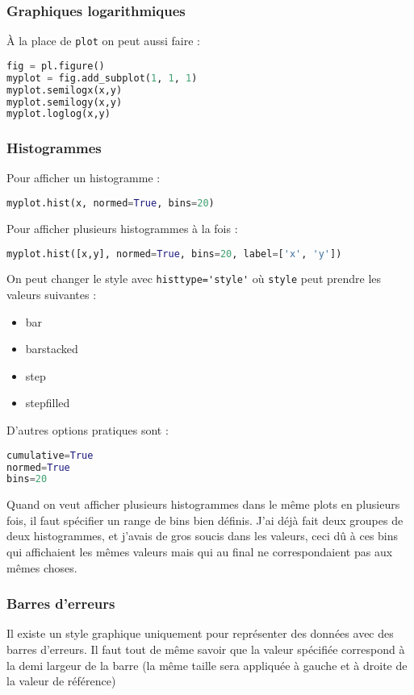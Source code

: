 \documentclass[a4paper,twoside]{article}
\begin{document}
\subsubsection{Graphiques logarithmiques}

À la place de \verb|plot| on peut aussi faire :
\begin{lstlisting}[language=python]
fig = pl.figure()
myplot = fig.add_subplot(1, 1, 1)
myplot.semilogx(x,y)
myplot.semilogy(x,y)
myplot.loglog(x,y)
\end{lstlisting}

\subsubsection{Histogrammes}
Pour afficher un histogramme :
\begin{lstlisting}[language=python]
myplot.hist(x, normed=True, bins=20)
\end{lstlisting}

Pour afficher plusieurs histogrammes à la fois :
\begin{lstlisting}[language=python]
myplot.hist([x,y], normed=True, bins=20, label=['x', 'y'])
\end{lstlisting}

\bigskip

On peut changer le style avec \verb|histtype='style'| où \verb|style| peut prendre les valeurs suivantes :
\begin{itemize}
\item bar
\item barstacked
\item step
\item stepfilled
\end{itemize}

D'autres options pratiques sont :
\begin{lstlisting}[language=python]
cumulative=True
normed=True
bins=20
\end{lstlisting}

\begin{attention}
Quand on veut afficher plusieurs histogrammes dans le même plots en plusieurs fois, il faut spécifier un range de bins bien définis. J'ai déjà fait deux groupes de deux histogrammes, et j'avais de gros soucis dans les valeurs, ceci dû à ces bins qui affichaient les mêmes valeurs mais qui au final ne correspondaient pas aux mêmes choses.
\end{attention}

\subsubsection{Barres d'erreurs}
Il existe un style graphique uniquement pour représenter des données avec des barres d'erreurs. Il faut tout de même savoir que la valeur spécifiée correspond à la demi largeur de la barre (la même taille sera appliquée à gauche et à droite de la valeur de référence)
\end{document}
